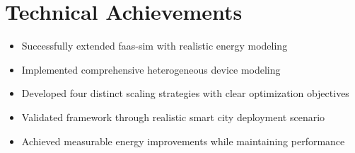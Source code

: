 \documentclass[12pt,a4paper]{report}
\begin{document}
\section*{Technical Achievements}
\begin{itemize}[leftmargin=1cm]
    \item Successfully extended faas-sim with realistic energy modeling
    \item Implemented comprehensive heterogeneous device modeling
    \item Developed four distinct scaling strategies with clear optimization objectives
    \item Validated framework through realistic smart city deployment scenario
    \item Achieved measurable energy improvements while maintaining performance
\end{itemize}
\end{document}
